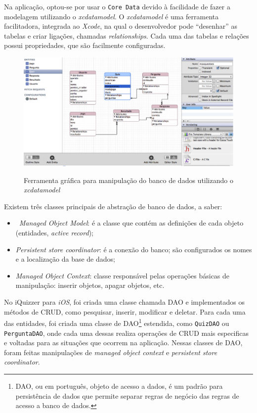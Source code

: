 		    Na aplicação, optou-se por usar o \texttt{Core Data} devido à facilidade de fazer a modelagem utilizando o \emph{xcdatamodel}. O \emph{xcdatamodel} é uma ferramenta facilitadora, integrada ao \emph{Xcode}, na qual o desenvolvedor pode ``desenhar'' as tabelas e criar ligações, chamadas \emph{relationships}. Cada uma das tabelas e relações possui propriedades, que são facilmente configuradas.
     
	 \begin{figure}[H]
	   \centering
	   \includegraphics{figs/iosmanaged.png}\\
	   \caption{ Ferramenta gráfica para manipulação do banco de dados utilizando o \emph{xcdatamodel} }
	   \label{FIG:iosmanaged}
	 \end{figure}
     
            Existem três classes principais de abstração de banco de dados, a saber:
\begin{itemize}
\item\ \emph{Managed Object Model}: é a classe que contém as definições de cada objeto (entidades, \emph{active record});
\item \emph{Persistent store coordinator}: é a conexão do banco; são configurados os nomes e a localização da base de dados;
\item \emph{Managed Object Context}: classe responsável pelas operações básicas de manipulação: inserir objetos, apagar objetos, etc.
\end{itemize}
   
    No iQuizzer para \emph{iOS}, foi criada uma classe chamada DAO e implementados os métodos de \ac{CRUD}, como pesquisar, inserir, modificar e deletar. Para cada uma das entidades, foi criada uma classe de \ac{DAO}\footnote{DAO, ou em português, objeto de acesso a dados, é um padrão para persistência de dados que permite separar regras de negócio das regras de acesso a banco de dados.} estendida, como \texttt{QuizDAO} ou \texttt{PerguntaDAO}, onde cada uma dessas realiza operações de \ac{CRUD} mais especificas e voltadas para as situações que ocorrem na aplicação. Nessas classes de \ac{DAO}, foram feitas manipulações de \emph{managed object context} e \emph{persistent store coordinator}.
            
